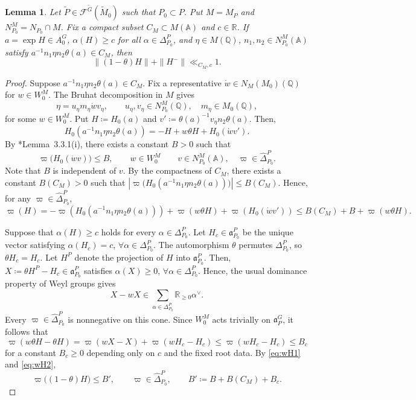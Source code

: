 \documentclass[12pt]{amsart}
\theoremstyle{definition}
\theoremstyle{plain}
\newtheorem{lemma}[definition]{Lemma}
\theoremstyle{remark}
\def\R{\mathbb{R}}%
\def\Q{\mathbb{Q}}%
\def\A{\mathbb{A}}%
\newcommand{\fa}{\mathfrak{a}}
\newcommand{\cF}{\mathcal{F}}
\numberwithin{equation}{section}
\newcommand{\tG}{\widetilde{G}}
\newcommand{\tM}{\widetilde{M}}
\newcommand{\tP}{\widetilde{P}}
\begin{document}
\begin{lemma}\label{lem:fsa-compact-support}
Let $\tP\in\cF^{\tG}(\tM_0)$ such that $P_0\subset P$.
Put $M=M_P$ and $N_{P_0}^M=N_{P_0}\cap M$.
Fix a compact subset $C_M\subset M(\A)$ and $c\in\R$.
If $a=\exp H\in A_0^G$, $\alpha(H)\geq c$ for all $\alpha\in \Delta_{P_0}^P$, and $\eta\in M(\Q)$, $n_1,n_2\in N_{P_0}^M(\A)$ satisfy $a^{-1}n_1\eta n_2\theta(a)\in C_M$, then 
\[
\|(1-\theta)H\|+\|H^-\|\ll_{C_M,c}1.
\]
\end{lemma}
\begin{proof}
Suppose $a^{-1}n_1\eta n_2\theta(a)\in C_M$. 
Fix a representative $\dot w\in N_M(M_0)(\Q)$ for $w\in W_0^M$.
The Bruhat decomposition in $M$ gives
\[
  \eta=u_\eta m_\eta\dot w v_\eta,
  \qquad
  u_\eta,v_\eta\in N_{P_0}^M(\Q),
  \quad m_\eta\in M_0(\Q),
\]
for some $w\in W_0^M$.
Put $H\coloneqq H_0(a)$ and $v'\coloneqq \theta(a)^{-1}v_\eta n_2\theta(a)$.
Then,
\[
  H_0(a^{-1}n_1\eta n_2\theta(a))=-H+w\theta H+H_0(\dot w v').
\]
By \cite{LW13}*{Lemma~3.3.1(i)}, there exists a constant $B>0$ such that  
\[
  \varpi\bigl(H_0(\dot w v)\bigr)\le B, \qquad w\in W_0^M
  \qquad v\in N_{P_0}^M(\A),
  \quad \varpi\in\widehat\Delta_{P_0}^P.
\]
Note that $B$ is independent of $v$. 
By the compactness of $C_M$, there exists a constant $B(C_M)>0$ such that $|\varpi\bigl(H_0(a^{-1}n_1\eta n_2\theta(a))\bigr)|\le B(C_M)$. 
Hence, for any $\varpi\in\widehat\Delta_{P_0}^P$,
\begin{equation}\label{eq:wH1}
\varpi(H)=-\varpi(H_0(a^{-1}n_1\eta n_2\theta(a)))+\varpi(w\theta H)+\varpi(H_0(\dot w v'))\le B(C_M)+B+\varpi(w\theta H).    
\end{equation}


Suppose that $\alpha(H)\geq c$ holds for every $\alpha\in \Delta_{P_0}^P$. 
Let $H_c\in\fa_{P_0}^P$ be the unique vector satisfying $\alpha(H_c)=c$, $\forall\alpha\in\Delta_{P_0}^P$. 
The automorphism $\theta$ permutes $\Delta_{P_0}^P$, so
$\theta H_c=H_c$. 
Let $H^P$ denote the projection of $H$ into $\fa_{P_0}^P$. 
Then, $X\coloneqq \theta H^P-H_c\in\fa_{P_0}^P$ satisfies $\alpha(X)\ge 0$, $\forall\alpha\in\Delta_{P_0}^P$.
Hence, the usual dominance property of Weyl groups gives
\[
  X-wX\in
  \sum_{\alpha\in\Delta_{P_0}^P}\R_{\geq 0}\alpha^\vee.
\]
Every $\varpi\in\widehat\Delta_{P_0}^P$ is nonnegative on this
cone. Since $W_0^M$ acts trivially on $\fa_P^G$, it follows that
\begin{equation}\label{eq:wH2}  \varpi(w\theta H-\theta H)
    =\varpi(wX-X)+\varpi(wH_c-H_c)
    \leq\varpi(wH_c-H_c)\leq B_c
\end{equation}
for a constant $B_c\geq0$ depending only on $c$ and the fixed root
data. 
By \eqref{eq:wH1} and \eqref{eq:wH2},
\[
  \varpi\bigl((1-\theta)H\bigr)\leq B',
  \qquad \varpi\in\widehat\Delta_{P_0}^P,
  \qquad B'\coloneqq B+B(C_M)+B_c.
\]



\end{proof}
\end{document}
